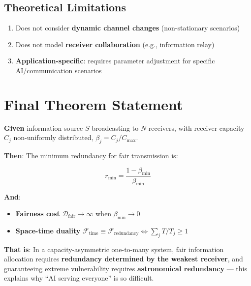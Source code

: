 \documentclass[12pt,a4paper]{article}
\newcommand{\calDfair}{\mathcal{D}_{\text{fair}}}
\newcommand{\calFtime}{\mathcal{F}_{\text{time}}}
\newcommand{\calFred}{\mathcal{F}_{\text{redundancy}}}
\newcommand{\betamin}{\beta_{\min}}
\newcommand{\betaj}{\beta_j}
\begin{document}
\subsection{Theoretical Limitations}
\begin{enumerate}
    \item Does not consider \textbf{dynamic channel changes} (non-stationary scenarios)
    \item Does not model \textbf{receiver collaboration} (e.g., information relay)
    \item \textbf{Application-specific}: requires parameter adjustment for specific AI/communication scenarios
\end{enumerate}

\section{Final Theorem Statement}

\begin{tcolorbox}[colback=blue!5!white,colframe=blue!75!black,title=D13 Big Pipe Theorem]
\textbf{Given} information source $S$ broadcasting to $N$ receivers, with receiver capacity $C_j$ non-uniformly distributed, $\betaj = C_j/C_{\max}$.

\textbf{Then}: The minimum redundancy for fair transmission is:

$$\boxed{r_{\min} = \frac{1 - \betamin}{\betamin}}$$

\textbf{And}:
\begin{itemize}
    \item \textbf{Fairness cost} $\calDfair \to \infty$ when $\betamin \to 0$
    \item \textbf{Space-time duality} $\calFtime \equiv \calFred \iff \sum_j T/T_j \geq 1$
\end{itemize}

\textbf{That is}: In a capacity-asymmetric one-to-many system, fair information allocation requires \textbf{redundancy determined by the weakest receiver}, and guaranteeing extreme vulnerability requires \textbf{astronomical redundancy} --- this explains why ``AI serving everyone'' is so difficult.
\end{tcolorbox}
\end{document}
